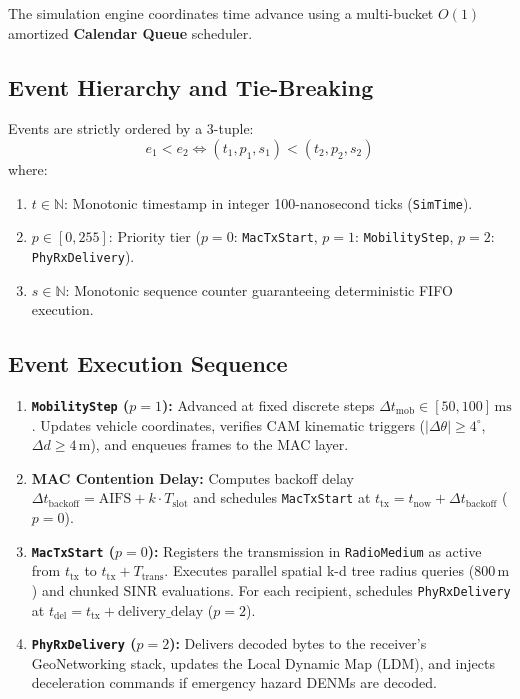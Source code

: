 \documentclass[11pt,a4paper]{article}
\begin{document}
The simulation engine coordinates time advance using a multi-bucket $O(1)$ amortized \textbf{Calendar Queue} scheduler.

\subsection{Event Hierarchy and Tie-Breaking}
Events are strictly ordered by a 3-tuple:
\begin{equation}
e_1 < e_2 \iff (t_1, p_1, s_1) < (t_2, p_2, s_2)
\end{equation}
where:
\begin{enumerate}[noitemsep]
    \item $t \in \mathbb{N}$: Monotonic timestamp in integer 100-nanosecond ticks (\texttt{SimTime}).
    \item $p \in [0, 255]$: Priority tier ($p=0$: \texttt{MacTxStart}, $p=1$: \texttt{MobilityStep}, $p=2$: \texttt{PhyRxDelivery}).
    \item $s \in \mathbb{N}$: Monotonic sequence counter guaranteeing deterministic FIFO execution.
\end{enumerate}

\subsection{Event Execution Sequence}
\begin{enumerate}
    \item \textbf{\texttt{MobilityStep} ($p=1$):} Advanced at fixed discrete steps $\Delta t_{\mathrm{mob}} \in [50, 100]\,\mathrm{ms}$. Updates vehicle coordinates, verifies CAM kinematic triggers ($|\Delta \theta| \ge 4^\circ$, $\Delta d \ge 4\,\mathrm{m}$), and enqueues frames to the MAC layer.
    \item \textbf{MAC Contention Delay:} Computes backoff delay $\Delta t_{\mathrm{backoff}} = \mathrm{AIFS} + k \cdot T_{\mathrm{slot}}$ and schedules \texttt{MacTxStart} at $t_{\mathrm{tx}} = t_{\mathrm{now}} + \Delta t_{\mathrm{backoff}}$ ($p=0$).
    \item \textbf{\texttt{MacTxStart} ($p=0$):} Registers the transmission in \texttt{RadioMedium} as active from $t_{\mathrm{tx}}$ to $t_{\mathrm{tx}} + T_{\mathrm{trans}}$. Executes parallel spatial k-d tree radius queries ($800\,\mathrm{m}$) and chunked SINR evaluations. For each recipient, schedules \texttt{PhyRxDelivery} at $t_{\mathrm{del}} = t_{\mathrm{tx}} + \text{delivery\_delay}$ ($p=2$).
    \item \textbf{\texttt{PhyRxDelivery} ($p=2$):} Delivers decoded bytes to the receiver's GeoNetworking stack, updates the Local Dynamic Map (LDM), and injects deceleration commands if emergency hazard DENMs are decoded.
\end{enumerate}
\end{document}

